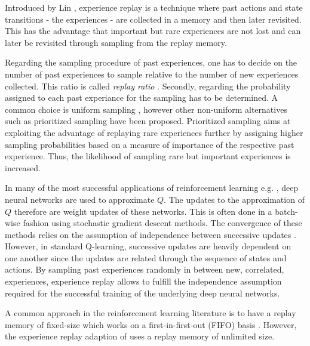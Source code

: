 \documentclass[a4paper,12pt]{article}
\begin{document}
Introduced by Lin \cite{lin1992self}, experience replay is a technique where past actions and state transitions - the experiences - are collected in a memory and then later revisited. 
This has the advantage that important but rare experiences are not lost and can later be revisited through sampling from the replay memory. 

Regarding the sampling procedure of past experiences, one has to decide on the number of past experiences to sample relative to the number of new experiences collected. This ratio is called \emph{replay ratio} \cite{fedus2020revisiting}. Secondly, regarding the probability assigned to each past experiance for the sampling has to be determined. A common choice is uniform sampling \cite{fedus2020revisiting}, however other non-uniform alternatives such as prioritized sampling \cite{schaul2015prioritized} have been proposed.
Prioritized sampling aims at exploiting the advantage of replaying rare experiences further by assigning higher sampling probabilities based on a measure of importance of the respective past experience. Thus, the likelihood of sampling rare but important experiences is increased.

In many of the most successful applications of reinforcement learning e.g. \cite{mnih2013playing}, deep neural networks are used to approximate $Q$. The updates to the approximation of $Q$ therefore are weight updates of these networks. This is often done in a batch-wise fashion using stochastic gradient descent methods. The convergence of these methods relies on the assumption of independence between successive updates \cite{fedus2020revisiting}. However, in standard Q-learning, successive updates are heavily dependent on one another since the updates are related through the sequence of states and actions. By sampling past experiences randomly in between new, correlated, experiences, experience replay allows to fulfill the independence assumption required for the successful training of the underlying deep neural networks.

A common approach in the reinforcement learning literature is to have a replay memory of fixed-size which works on a first-in-first-out (FIFO) basis \cite{fedus2020revisiting}. However, the experience replay adaption of \cite{avila2023batch} uses a replay memory of unlimited size.


\end{document}
